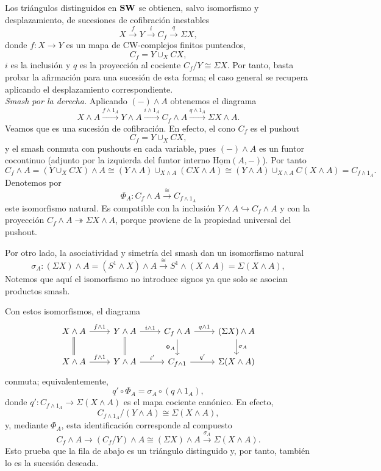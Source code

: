 \begin{sol}
Los triángulos distinguidos en $\mathbf{SW}$ se obtienen, salvo isomorfismo y desplazamiento, de sucesiones de cofibración inestables
\[
X\xrightarrow{f}Y\xrightarrow{i}C_f\xrightarrow{q}\Sigma X,
\]
donde $f\colon X\to Y$ es un mapa de CW-complejos finitos punteados,
\[
C_f=Y\cup_X CX,
\]
$i$ es la inclusión y $q$ es la proyección al cociente $C_f/Y\cong\Sigma X$. Por tanto, basta probar la afirmación para una sucesión de esta forma; el caso general se recupera aplicando el desplazamiento correspondiente.\\
\medskip
\noindent\emph{Smash por la derecha.}
Aplicando $(-)\wedge A$ obtenemos el diagrama
\[
X\wedge A \xrightarrow{f\wedge 1_A} Y\wedge A \xrightarrow{i\wedge 1_A} C_f\wedge A \xrightarrow{q\wedge 1_A} \Sigma X\wedge A.
\]
Veamos que es una sucesión de cofibración. En efecto, el cono $C_f$ es el pushout
\[
C_f=Y\cup_X CX,
\]
y el smash conmuta con pushouts en cada variable, pues $(-)\wedge A$ es un funtor cocontinuo (adjunto por la izquierda del funtor interno $\underline{\mathrm{Hom}}(A,-)$). Por tanto
\[
C_f\wedge A
=(Y\cup_X CX)\wedge A
\cong (Y\wedge A)\cup_{X\wedge A}(CX\wedge A)
\cong (Y\wedge A)\cup_{X\wedge A}C(X\wedge A)
=C_{f\wedge 1_A}.
\]
Denotemos por
\[
\Phi_A\colon C_f\wedge A\xrightarrow{\ \cong\ }C_{f\wedge 1_A}
\]
este isomorfismo natural. Es compatible con la inclusión $Y\wedge A\hookrightarrow C_f\wedge A$ y con la proyección $C_f\wedge A\twoheadrightarrow \Sigma X\wedge A$, porque proviene de la propiedad universal del pushout.

Por otro lado, la asociatividad y simetría del smash dan un isomorfismo natural
\[
\sigma_A\colon (\Sigma X)\wedge A=(S^{1}\wedge X)\wedge A
\xrightarrow{\ \cong\ }S^{1}\wedge(X\wedge A)=\Sigma(X\wedge A),
\]
Notemos que aquí el isomorfismo no introduce signos ya que solo se asocian productos smash.

Con estos isomorfismos, el diagrama
\[
\begin{tikzcd}
X\wedge A \arrow[r,"f\wedge1"] \arrow[d,equal] &
Y\wedge A \arrow[r,"i\wedge1"] \arrow[d,equal] &
C_f\wedge A \arrow[r,"q\wedge1"] \arrow[d,"\Phi_A"'] &
(\Sigma X)\wedge A \arrow[d,"\sigma_A"] \\
X\wedge A \arrow[r,"f\wedge1"] &
Y\wedge A \arrow[r,"i'"] &
C_{f\wedge1} \arrow[r,"q'"] &
\Sigma(X\wedge A)
\end{tikzcd}
\]
conmuta; equivalentemente,
\[
q'\circ\Phi_A=\sigma_A\circ(q\wedge1_A),
\]
donde $q'\colon C_{f\wedge1_A}\to\Sigma(X\wedge A)$ es el mapa cociente canónico. En efecto,
\[
C_{f\wedge1_A}/(Y\wedge A)\cong\Sigma(X\wedge A),
\]
y, mediante $\Phi_A$, esta identificación corresponde al compuesto
\[
C_f\wedge A\longrightarrow (C_f/Y)\wedge A
\cong(\Sigma X)\wedge A
\xrightarrow{\sigma_A}\Sigma(X\wedge A).
\]
Esto prueba que la fila de abajo es un triángulo distinguido y, por tanto, también lo es la sucesión deseada.


\end{sol}
